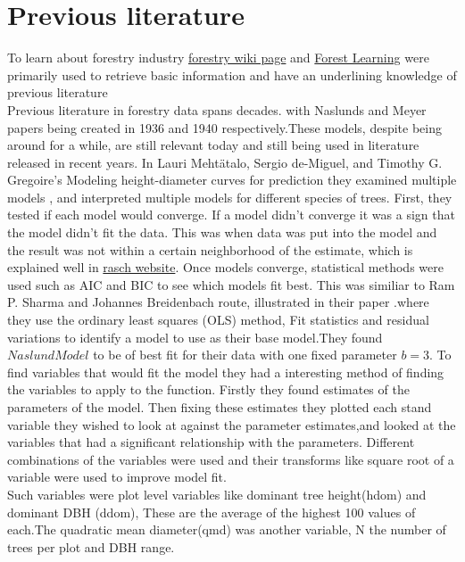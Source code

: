 \documentclass[a4paper,11pt,twoside]{report}
\begin{document}
\chapter{Previous literature}
To learn about forestry industry \href{http://wiki.awf.forst.uni-goettingen.de/wiki/index.php/Category:Forest_inventory}{forestry wiki page} and \href{http://forestlearning.edu.au/about/forest-terminology-explained.html}{Forest Learning} were primarily used to retrieve basic information and have an underlining knowledge of previous literature\\
Previous literature in forestry data spans decades. with Naslunds\cite{naslund1936skogsforsoksanstaltens} and Meyer papers\cite{Meyer}  being created in 1936 and 1940 respectively.These models, despite being around for a while, are still relevant today and still being used in literature released in recent years. 
In Lauri Mehtätalo, Sergio de-Miguel, and Timothy G. Gregoire's Modeling height-diameter curves for prediction they examined multiple models \cite{mehtatalo2015modeling}, and interpreted multiple models for different species of trees. First, they tested if each model would converge. If a model didn’t converge it was a sign that the model didn’t fit the data. This was when data was put into the model and the result was not within a certain neighborhood of the estimate, which is explained well in \href{https://www.rasch.org/rmt/rmt11b.htm}{rasch website}.
Once models converge, statistical methods were used such as AIC and BIC to see which models fit best. This was similiar to Ram P. Sharma and Johannes Breidenbach route, illustrated in their paper \cite{ModelingNorwaySpruceScotsPine}.where they use the ordinary least squares (OLS) method, Fit statistics and residual variations to identify a model to use as their base model.They found $Naslund Model$ to be of best fit for their data with one fixed parameter $b=3$. To find variables that would fit the model they had a interesting method of finding the variables to apply to the function. Firstly they found estimates of the parameters of the model. Then fixing these estimates they plotted each stand variable they wished to look at against the parameter estimates,and looked at the variables that had a significant relationship with the parameters. Different combinations of the variables were used and their transforms like square root of a variable were used to improve model fit. \\
Such variables were plot level variables like dominant tree height(hdom) and dominant DBH (ddom), These are the average of the highest 100 values of each.The quadratic mean diameter(qmd) was another variable, N the number of trees per plot and DBH range.\\ 
\end{document}
